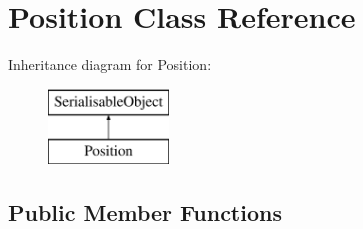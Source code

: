 \hypertarget{classPosition}{\section{Position Class Reference}
\label{classPosition}
}
Inheritance diagram for Position\-:\begin{figure}[H]
\begin{center}
\leavevmode
\includegraphics[height=2.000000cm]{classPosition}
\end{center}
\end{figure}
\subsection*{Public Member Functions}

